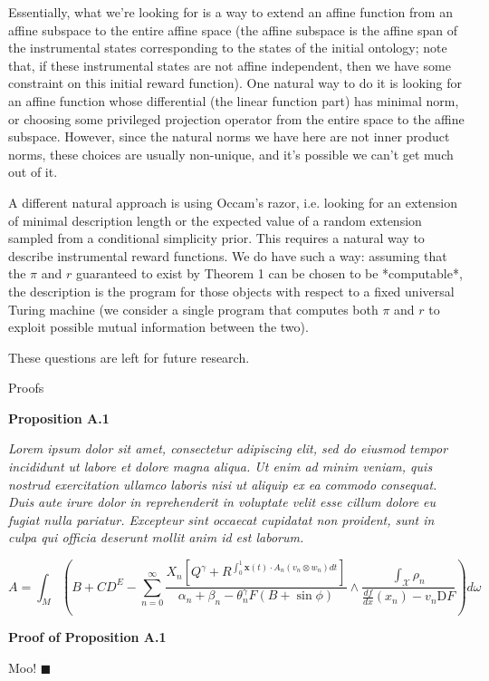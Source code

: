 \documentclass[a4paper]{article}
\newcommand{\Co}[1]{}
\begin{document}
Essentially, what we're looking for is a way to extend an affine function from an affine subspace to the entire affine space (the affine subspace is the affine span of the instrumental states corresponding to the states of the initial ontology; note that, if these instrumental states are not affine independent, then we have some constraint on this initial reward function). One natural way to do it is looking for an affine function whose differential (the linear function part) has minimal norm, or choosing some privileged projection operator from the entire space to the affine subspace. However, since the natural norms we have here are not inner product norms, these choices are usually non-unique, and it's possible we can't get much out of it.

A different natural approach is using Occam's razor, i.e. looking for an extension of minimal description length or the expected value of a random extension sampled from a conditional simplicity prior. This requires a natural way to describe instrumental reward functions. We do have such a way: assuming that the $\pi$ and $r$ guaranteed to exist by Theorem 1 can be chosen to be *computable*, the description is the program for those objects with respect to a fixed universal Turing machine (we consider a single program that computes both $\pi$ and $r$ to exploit possible mutual information between the two).

These questions are left for future research.

\begin{Huge}Proofs\end{Huge}

\textbf{Proposition A.1}\Co{b}

\textit{Lorem ipsum dolor sit amet, consectetur adipiscing elit, sed do eiusmod tempor incididunt ut labore et dolore magna aliqua. Ut enim ad minim veniam, quis nostrud exercitation ullamco laboris nisi ut aliquip ex ea commodo consequat. Duis aute irure dolor in reprehenderit in voluptate velit esse cillum dolore eu fugiat nulla pariatur. Excepteur sint occaecat cupidatat non proident, sunt in culpa qui officia deserunt mollit anim id est laborum.}\Co{i}

$$A=\int_M{\left(B+CD^E-\sum_{n=0}^\infty\frac{X_n\left[Q^\gamma+R^{\int_0^1\boldsymbol{x}(t)\cdot A_n\left(v_n\otimes w_n\right) dt}\right]}{\alpha_n+\beta_n-\theta_n^\gamma F\left(B+\sin\phi\right)}\land\frac{\int_\mathcal{X}\rho_n}{\frac{df}{dx}\left(x_n\right)-v_n\mathrm{D}F}\right)}d\omega$$

\textbf{Proof of Proposition A.1}\Co{b}

Moo! $\blacksquare$
\end{document}
